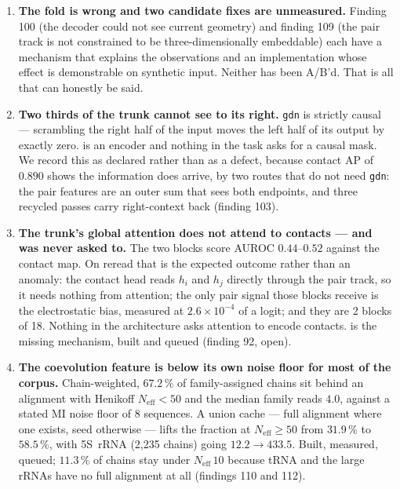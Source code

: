 \documentclass[11pt,a4paper]{article}
\begin{document}
\begin{enumerate}
\item \textbf{The fold is wrong and two candidate fixes are
  unmeasured.} Finding 100 (the decoder could not see current geometry)
  and finding 109 (the pair track is not constrained to be
  three-dimensionally embeddable) each have a mechanism that explains the
  observations and an implementation whose effect is demonstrable on
  synthetic input. Neither has been A/B'd. That is all that can honestly
  be said.

\item \textbf{Two thirds of the trunk cannot see to its right.}
  \texttt{gdn} is strictly causal --- scrambling the right half of the
  input moves the left half of its output by exactly zero. \pharos{} is
  an encoder and nothing in the task asks for a causal mask. We record
  this as declared rather than as a defect, because contact AP of $0.890$
  shows the information does arrive, by two routes that do not need
  \texttt{gdn}: the pair features are an outer sum that sees both
  endpoints, and three recycled passes carry right-context back
  (finding 103).

\item \textbf{The trunk's global attention does not attend to contacts
  --- and was never asked to.} The two  blocks score AUROC
  $0.44$--$0.52$ against the contact map. On reread that is the expected
  outcome rather than an anomaly: the contact head reads $h_i$ and $h_j$
  directly through the pair track, so it needs nothing from attention;
  the only pair signal those blocks receive is the electrostatic bias,
  measured at $2.6\times10^{-4}$ of a logit; and they are 2 blocks of 18.
  Nothing in the architecture asks attention to encode contacts.
   is the missing mechanism, built and queued
  (finding 92, open).

\item \textbf{The coevolution feature is below its own noise floor for
  most of the corpus.} Chain-weighted, $67.2\,\%$ of family-assigned
  chains sit behind an alignment with Henikoff $N_{\text{eff}} < 50$ and
  the median family reads $4.0$, against a stated MI noise floor of 8
  sequences. A union cache --- full alignment where one exists, seed
  otherwise --- lifts the fraction at $N_{\text{eff}} \ge 50$ from
  $31.9\,\%$ to $58.5\,\%$, with 5S~rRNA (2,235 chains) going
  $12.2 \to 433.5$. Built, measured, queued; $11.3\,\%$ of chains stay
  under $N_{\text{eff}}\,10$ because tRNA and the large rRNAs have no
  full alignment at all (findings 110 and 112).


\end{enumerate}
\end{document}
